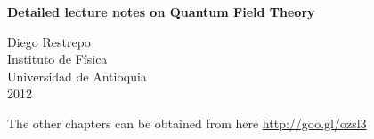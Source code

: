 \documentclass[12pt,letterpaper]{book}
\theoremstyle{example}
\newcommand{\tofc}[1]{#1} %
\begin{document}
\renewcommand{\thepage}{\roman{page}}
\begin{titlepage}
  \begin{center}

    
\textbf{\huge    Detailed lecture notes on Quantum Field Theory}

    

\vspace{4cm}
 Diego Restrepo\\
Instituto de Física\\
Universidad de Antioquia\\
2012
    
  \end{center}
\end{titlepage}





\tofc{
\renewcommand{\thepage}{\roman{page}}
\tableofcontents{}

\newpage{}
}

\renewcommand{\thepage}{\arabic{page}}
\setcounter{page}{1}









The other chapters can be obtained from here \url{http://goo.gl/ozsl3}
% 
% 
% 
% 
% 
% 
% 
% 

\end{document}
